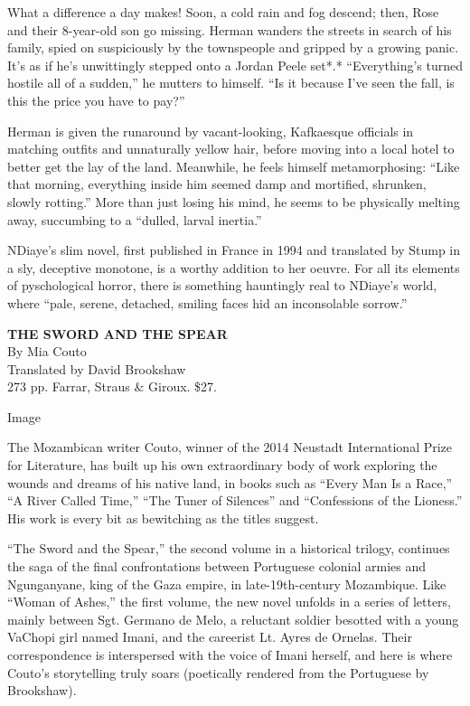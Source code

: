 What a difference a day makes! Soon, a cold rain and fog descend; then,
Rose and their 8-year-old son go missing. Herman wanders the streets in
search of his family, spied on suspiciously by the townspeople and
gripped by a growing panic. It's as if he's unwittingly stepped onto a
Jordan Peele set*.* ``Everything's turned hostile all of a sudden,'' he
mutters to himself. ``Is it because I've seen the fall, is this the
price you have to pay?''

Herman is given the runaround by vacant-looking, Kafkaesque officials in
matching outfits and unnaturally yellow hair, before moving into a local
hotel to better get the lay of the land. Meanwhile, he feels himself
metamorphosing: ``Like that morning, everything inside him seemed damp
and mortified, shrunken, slowly rotting.'' More than just losing his
mind, he seems to be physically melting away, succumbing to a ``dulled,
larval inertia.''

NDiaye's slim novel, first published in France in 1994 and translated by
Stump in a sly, deceptive monotone, is a worthy addition to her oeuvre.
For all its elements of pyschological horror, there is something
hauntingly real to NDiaye's world, where ``pale, serene, detached,
smiling faces hid an inconsolable sorrow.''

\textbf{\textbf{THE SWORD AND THE SPEAR}}\\
By Mia Couto\\
Translated by David Brookshaw\\
273 pp. Farrar, Straus \& Giroux. \$27.

Image

The Mozambican writer Couto, winner of the 2014 Neustadt International
Prize for Literature, has built up his own extraordinary body of work
exploring the wounds and dreams of his native land, in books such as
``Every Man Is a Race,'' ``A River Called Time,'' ``The Tuner of
Silences'' and ``Confessions of the Lioness.'' His work is every bit as
bewitching as the titles suggest.

``The Sword and the Spear,'' the second volume in a historical trilogy,
continues the saga of the final confrontations between Portuguese
colonial armies and Ngunganyane, king of the Gaza empire, in
late-19th-century Mozambique. Like ``Woman of Ashes,'' the first volume,
the new novel unfolds in a series of letters, mainly between Sgt.
Germano de Melo, a reluctant soldier besotted with a young VaChopi girl
named Imani, and the careerist Lt. Ayres de Ornelas. Their
correspondence is interspersed with the voice of Imani herself, and here
is where Couto's storytelling truly soars (poetically rendered from the
Portuguese by Brookshaw).

